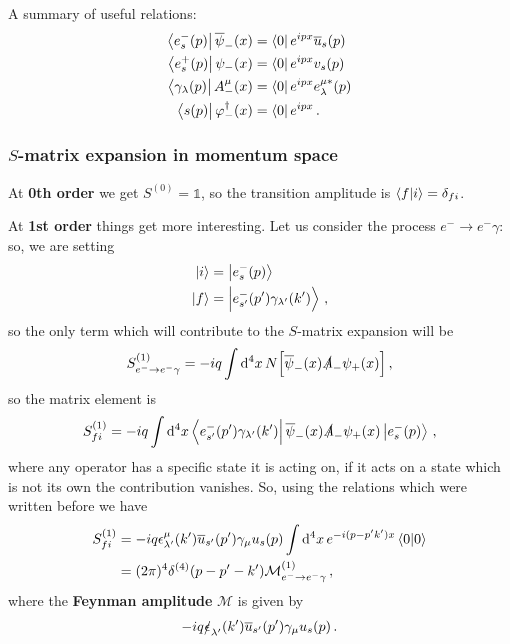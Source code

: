 \documentclass[main.tex]{subfiles}
\begin{document}
A summary of useful relations: 
%
\begin{align}
\bra{e^{-}_{s} (p)} \overline{\psi}_{-} (x) &= \bra{0} e^{ipx} \overline{u}_{s} (p) \\
\bra{e^{+}_{s} (p)} \psi_{-} (x) &= \bra{0} e^{ipx} v_{s} (p) \\
\bra{\gamma_{\lambda } (p)} A^{\mu }_{-} (x) &= \bra{0} e^{ipx} e^{\mu *}_{\lambda }(p) \\
\bra{s(p)} \varphi ^\dag_{-} (x) &= \bra{0} e^{ipx} 
\,.
\end{align}

\subsubsection{\(S\)-matrix expansion in momentum space}

At \textbf{0th order} we get \(S^{(0)} = \mathbb{1}\), so the transition amplitude is \(\braket{f}{i}= \delta_{fi} \). 

At \textbf{1st order} things get more interesting. Let us consider the process \(e^{-} \to e^{-} \gamma \): so, we are setting 
%
\begin{align}
\ket{i} &= \ket{e^{-}_{s}(p)}  \\
\ket{f} &= \ket{e^{-}_{s'} (p') \gamma_{\lambda'} (k')}
\,,
\end{align}
%
so the only term which will contribute to the \(S\)-matrix expansion will be 
%
\begin{align}
S^{(1)}_{e^{-} \to e^{-}\gamma } 
= -iq \int \dd[4]{x} N \qty[ \overline{\psi}_{-} (x) \slashed{A}_{-} \psi_{+} (x)]
\,,
\end{align}
%
so the matrix element is 
%
\begin{align}
S^{(1)}_{fi} = -iq \int \dd[4]{x} \bra{e^{-}_{s'} (p') \gamma_{\lambda'} (k')} \overline{\psi}_{-} (x) \slashed{A}_{-} \psi_{+} (x) \ket{e^{-}_{s}(p)}
\,,
\end{align}
%
where any operator has a specific state it is acting on, if it acts on a state which is not its own the contribution vanishes. 
So, using the relations which were written before we have 
%
\begin{align}
S^{(1)}_{fi} &= -iq \epsilon^{\mu }_{\lambda' } (k') \overline{u}_{s'} (p') \gamma_{\mu } u_s (p) \int \dd[4]{x} e^{-i(p - p' k')x} \braket{0}{0}  \\
&= (2 \pi )^{4} \delta^{(4)} (p - p' - k') \mathcal{M}^{(1)}_{e^{-} \to e^{-}\gamma }
\,,
\end{align}
%
where the \textbf{Feynman amplitude} \(\mathcal{M}\) is given by 
%
\begin{align}
-iq \slashed{\epsilon}_{\lambda' } (k') \overline{u}_{s'} (p') \gamma_{\mu } u_s (p)
\,.
\end{align}
\end{document}

